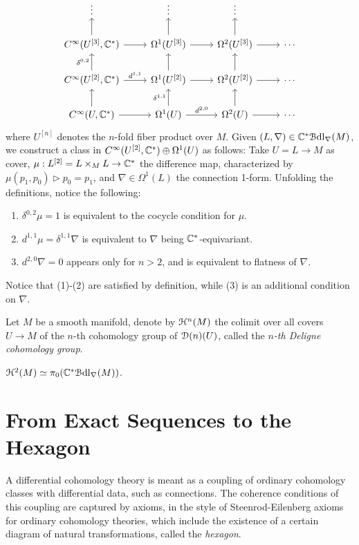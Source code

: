 \documentclass[10pt]{amsart}
\begin{document}
\begin{equation}\label{eq:bicomp}
	\begin{tikzcd}
		\vdots & \vdots & \vdots   \\
		C^\infty(U^{[3]},\bC^*) \arrow[r]\arrow[u] & \Omega^1(U^{[3]}) \arrow[r]\arrow[u] &  \Omega^2(U^{[3]}) \arrow[u] \arrow[r] & \cdots \\ 
		C^\infty(U^{[2]},\bC^*) \arrow[r," d^{1,1}"]\arrow[u,"\delta^{0,2}"] & \Omega^1(U^{[2]}) \arrow[u]\arrow[r] & \Omega^2(U^{[2]}) \arrow[u]\arrow[r] & \cdots\\
		C^\infty(U,\bC^*) \arrow[r]\arrow[u] & \Omega^1(U) \arrow[r," d^{2,0}"]\arrow[u,"\delta^{1,1}"] & \Omega^2(U) \arrow[u] \arrow[r] & \cdots
	\end{tikzcd}
\end{equation}where $U^{[n]}$ denotes the $n$-fold fiber product over $M$. Given $(L,\nabla)\in\mathbb{C}^*\mathcal{B}\mathrm{dl}_\nabla(M)$, we construct a class in $C^\infty(U^{[2]},\mathbb{C}^*)\oplus\Omega^1(U)$ as follows: Take $U=L\to M$ as cover, $\mu:L^{[2]}=L\times_ML\to\mathbb{C}^*$ the difference map, characterized by $\mu(p_1,p_0)\triangleright p_0=p_1$, and $\nabla\in\Omega^1(L)$ the connection 1-form. Unfolding the definitions, notice the following:
\begin{enumerate}
	\item $\delta^{0,2}\mu=1$ is equivalent to the cocycle condition for $\mu$.
	\item $ d^{1,1}\mu=\delta^{1,1}\nabla$ is equivalent to $\nabla$ being $\mathbb{C}^*$-equivariant.
	\item $ d^{2,0}\nabla=0$ appears only for $n>2$, and is equivalent to flatness of $\nabla$.  
\end{enumerate}
Notice that (1)-(2) are satisfied by definition, while (3) is an additional condition on $\nabla$.
\begin{definition}
	Let $M$ be a smooth manifold, denote by $\mathcal{H}^n(M)$ the colimit over all covers $U\to M$ of the $n$-th cohomology group of $\mathcal{D}(n)(U)$, called the \emph{$n$-th Deligne cohomology group}. 
\end{definition}
\begin{theorem}
	$\mathcal{H}^2(M)\simeq\pi_0(\mathbb{C}^*\mathcal{B}\mathrm{dl}_\nabla(M))$.
\end{theorem} 

\section{From Exact Sequences to the Hexagon}
A differential cohomology theory is meant as a coupling of ordinary cohomology classes with differential data, such as connections. The coherence conditions of this coupling are captured by axioms, in the style of Steenrod-Eilenberg axioms for ordinary cohomology theories, which include the existence of a certain diagram of natural transformations, called the \emph{hexagon}.
\end{document}
